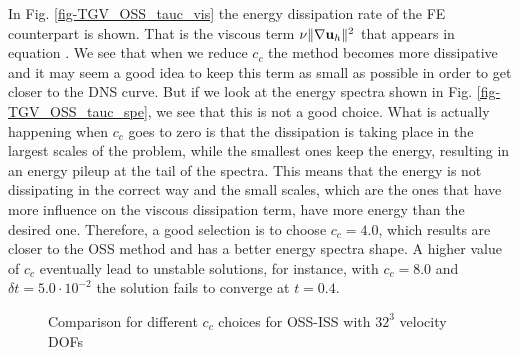 In Fig. \ref{fig-TGV_OSS_tauc_vis} the energy dissipation rate of the FE counterpart is shown. That is the viscous term $\nu\|\nabla{\bf u}_h\|^2$ that appears in equation . We see that when we reduce $c_c$ the method becomes more dissipative and it may seem a good idea to keep this term as small as possible in order to get closer to the DNS curve. But if we look at the energy spectra shown in Fig. \ref{fig-TGV_OSS_tauc_spe}, we see that this is not a good choice. What is actually happening when $c_c$ goes to zero is that the dissipation is taking place in the largest scales of the problem, while the smallest ones keep the energy, resulting in an energy pileup at the tail of the spectra. This means that the energy is not dissipating in the correct way and the small scales, which are the ones that have more influence on the viscous dissipation term, have more energy than the desired one. Therefore, a good selection is to choose $c_c=4.0$, which results are closer to the OSS method and has a better energy spectra shape. A higher value of $c_c$ eventually lead to unstable solutions, for instance, with $c_c=8.0$ and $\delta t=5.0\cdot10^{-2}$ the solution fails to converge at $t=0.4$.
\begin{figure}[h!]
  \centering
  \caption{Comparison for different $c_c$ choices for OSS-ISS with $32^3$ velocity DOFs}
  \label{fig-TGV_OSS_tauc}
\end{figure}

